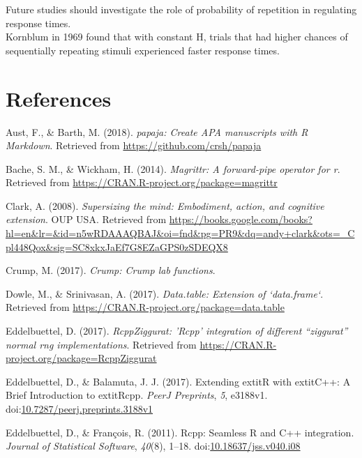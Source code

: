 \documentclass[floatsintext,man]{apa6}
\theoremstyle{definition}
\theoremstyle{definition}
\theoremstyle{definition}
\theoremstyle{remark}
\begin{document}
Future studies should investigate the role of probability of repetition
in regulating response times.\\
Kornblum in 1969 found that with constant H, trials that had higher
chances of sequentially repeating stimuli experienced faster response
times.

\newpage

\section{References}\label{references}

\begingroup
\setlength{\parindent}{-0.5in} \setlength{\leftskip}{0.5in}

\hypertarget{refs}{}
\hypertarget{ref-R-papaja}{}
Aust, F., \& Barth, M. (2018). \emph{papaja: Create APA manuscripts with
R Markdown}. Retrieved from \url{https://github.com/crsh/papaja}

\hypertarget{ref-R-magrittr}{}
Bache, S. M., \& Wickham, H. (2014). \emph{Magrittr: A forward-pipe
operator for r}. Retrieved from
\url{https://CRAN.R-project.org/package=magrittr}

\hypertarget{ref-clark_supersizing_2008}{}
Clark, A. (2008). \emph{Supersizing the mind: Embodiment, action, and
cognitive extension}. OUP USA. Retrieved from
\url{https://books.google.com/books?hl=en\&lr=\&id=n5wRDAAAQBAJ\&oi=fnd\&pg=PR9\&dq=andy+clark\&ots=_Cpl448Qox\&sig=SC8xkxJaEf7G8EZaGPS0zSDEQX8}

\hypertarget{ref-R-Crump}{}
Crump, M. (2017). \emph{Crump: Crump lab functions}.

\hypertarget{ref-R-data.table}{}
Dowle, M., \& Srinivasan, A. (2017). \emph{Data.table: Extension of
`data.frame`}. Retrieved from
\url{https://CRAN.R-project.org/package=data.table}

\hypertarget{ref-R-RcppZiggurat}{}
Eddelbuettel, D. (2017). \emph{RcppZiggurat: 'Rcpp' integration of
different ``ziggurat'' normal rng implementations}. Retrieved from
\url{https://CRAN.R-project.org/package=RcppZiggurat}

\hypertarget{ref-R-Rcpp_b}{}
Eddelbuettel, D., \& Balamuta, J. J. (2017). Extending extitR with
extitC++: A Brief Introduction to extitRcpp. \emph{PeerJ Preprints},
\emph{5}, e3188v1.
doi:\href{https://doi.org/10.7287/peerj.preprints.3188v1}{10.7287/peerj.preprints.3188v1}

\hypertarget{ref-R-Rcpp_a}{}
Eddelbuettel, D., \& François, R. (2011). Rcpp: Seamless R and C++
integration. \emph{Journal of Statistical Software}, \emph{40}(8),
1--18.
doi:\href{https://doi.org/10.18637/jss.v040.i08}{10.18637/jss.v040.i08}
\end{document}
